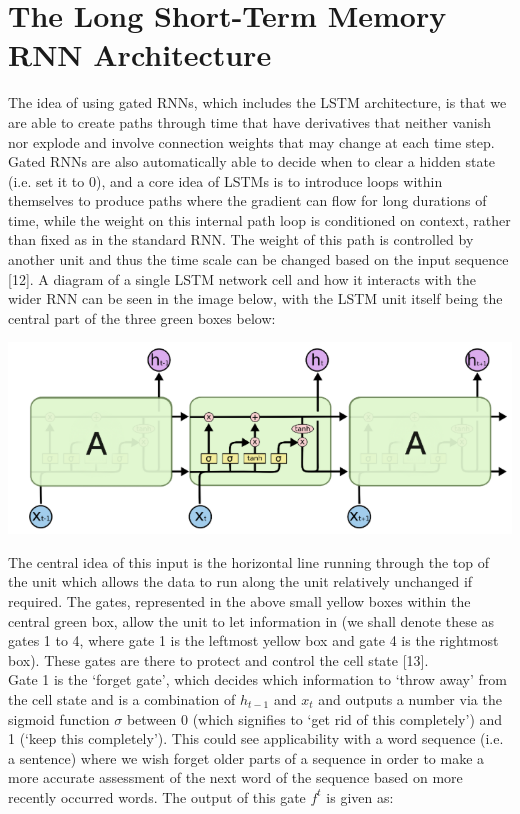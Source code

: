 \documentclass[12pt,twoside]{report}
\begin{document}
\section{The Long Short-Term Memory RNN Architecture}

\quad The idea of using gated RNNs, which includes the LSTM architecture, is that we are able to create paths through time that have derivatives that neither vanish nor explode and involve connection weights that may change at each time step. Gated RNNs are also automatically able to decide when to clear a hidden state (i.e. set it to 0), and a core idea of LSTMs is to introduce loops within themselves to produce paths where the gradient can flow for long durations of time, while the weight on this internal path loop is conditioned on context, rather than fixed as in the standard RNN. The weight of this path is controlled by another unit and thus the time scale can be changed based on the input sequence [12]. A diagram of a single LSTM network cell and how it interacts with the wider RNN can be seen in the image below, with the LSTM unit itself being the central part of the three green boxes below:\\

\begin{center}
\includegraphics[scale=0.7]{project_figures/fig3_7}
\end{center}

\quad The central idea of this input is the horizontal line running through the top of the unit which allows the data to run along the unit relatively unchanged if required. The gates, represented in the above small yellow boxes within the central green box, allow the unit to let information in (we shall denote these as gates 1 to 4, where gate 1 is the leftmost yellow box and gate 4 is the rightmost box). These gates are there to protect and control the cell state [13].\\

\quad Gate 1 is the ‘forget gate’, which decides which information to ‘throw away’ from the cell state and is a combination of $h_{t-1}$ and $x_t$ and outputs a number via the sigmoid function $\sigma$ between 0 (which signifies to ‘get rid of this completely’) and 1 (‘keep this completely’). This could see applicability with a word sequence (i.e. a sentence) where we wish forget older parts of a sequence in order to make a more accurate assessment of the next word of the sequence based on more recently occurred words. The output of this gate $f^t$ is given as:\\
\end{document}
